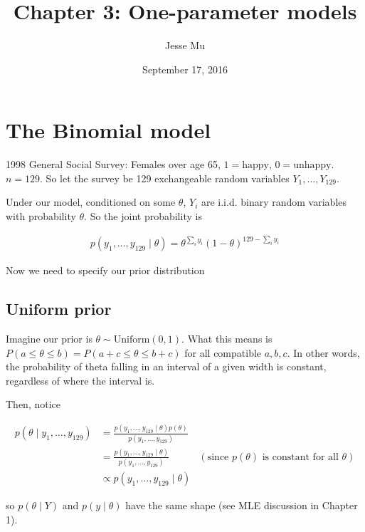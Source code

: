 \documentclass[
]{article}
\title{Chapter 3: One-parameter models}
\author{Jesse Mu}
\date{September 17, 2016}
\begin{document}
\maketitle

{
\setcounter{tocdepth}{2}
\tableofcontents
}
\hypertarget{the-binomial-model}{%
\section{The Binomial model}\label{the-binomial-model}}

1998 General Social Survey: Females over age 65, \(1 = \text{happy}\),
\(0 = \text{unhappy}\). \(n = 129\). So let the survey be 129
exchangeable random variables \(Y_1, \dots, Y_{129}\).

Under our model, conditioned on some \(\theta\), \(Y_i\) are i.i.d.
binary random variables with probability \(\theta\). So the joint
probability is

\begin{align}
p(y_1, \dots, y_{129} \mid \theta) = \theta^{\sum_{i} y_i} (1 - \theta)^{129 -
\sum_i y_i}
\end{align}

Now we need to specify our prior distribution

\hypertarget{uniform-prior}{%
\subsection{Uniform prior}\label{uniform-prior}}

Imagine our prior is \(\theta \sim \text{Uniform}(0, 1)\). What this
means is \(P(a \leq \theta \leq b) = P(a + c \leq \theta \leq b + c)\)
for all compatible \(a, b, c\). In other words, the probability of theta
falling in an interval of a given width is constant, regardless of where
the interval is.

Then, notice

\begin{align}
p(\theta \mid y_1, \dots, y_{129}) &= \frac{p(y_1, \dots, y_{129} \mid \theta) p(\theta)}{p(y_1, \dots, y_{129})} \\
&= \frac{p(y_1, \dots, y_{129} \mid \theta)}{p(y_1, \dots, y_{129})} & (\text{since $p(\theta)$ is constant for all $\theta$}) \\
&\propto p(y_1, \dots, y_{129} \mid \theta)
\end{align}

so \(p(\theta \mid Y)\) and \(p(y \mid \theta)\) have the same shape
(see MLE discussion in Chapter 1).
\end{document}

